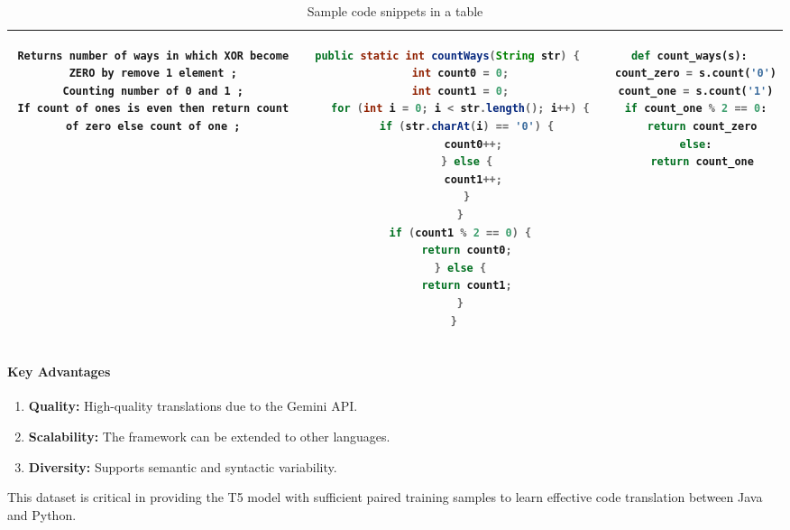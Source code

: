 \documentclass{dhbenelux}
\begin{document}
\begin{table}[h!]
{\begin{tabular}{|c|c|c|}
\begin{minipage}[t]{0.3\textwidth}
\begin{lstlisting}[basicstyle=\ttfamily\scriptsize, breaklines=true]
Returns number of ways in which XOR become ZERO by remove 1 element ;
Counting number of 0 and 1 ;
If count of ones is even then return count of zero else count of one ;
\end{lstlisting}
\end{minipage}
&
\begin{minipage}[t]{0.3\textwidth}
\begin{lstlisting}[language=Java, basicstyle=\ttfamily\scriptsize, breaklines=true]
public static int countWays(String str) {
    int count0 = 0;
    int count1 = 0;
    for (int i = 0; i < str.length(); i++) {
      if (str.charAt(i) == '0') {
        count0++;
      } else {
        count1++;
      }
    }
    if (count1 % 2 == 0) {
      return count0;
    } else {
      return count1;
    }
  }
\end{lstlisting}
\end{minipage}
&
\begin{minipage}[t]{0.3\textwidth}
\begin{lstlisting}[language=Python, basicstyle=\ttfamily\scriptsize, breaklines=true]
def count_ways(s):
  count_zero = s.count('0')
  count_one = s.count('1')
  if count_one % 2 == 0:
    return count_zero
  else:
    return count_one
\end{lstlisting}
\end{minipage}
\\
\hline
\end{tabular}
}
\caption{Sample code snippets in a table}
\end{table}

\paragraph{Key Advantages}
\begin{enumerate}
    \item \textbf{Quality:} High-quality translations due to the Gemini API.
    \item \textbf{Scalability:} The framework can be extended to other languages.
    \item \textbf{Diversity:} Supports semantic and syntactic variability.
\end{enumerate}

This dataset is critical in providing the T5 model with sufficient paired training samples to learn effective code translation between Java and Python.
\end{document}
